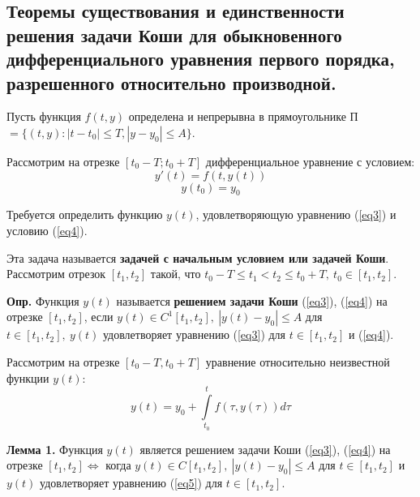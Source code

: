 \subsection{Теоремы существования и единственности решения задачи Коши для обыкновенного дифференциального уравнения первого порядка, разрешенного относительно производной.}

Пусть функция $f(t,y)$ определена и непрерывна в прямоугольнике 
П$ = \{(t, y) : |t - t_0| \leqslant T, |y - y_0| \leqslant A\}$.

Рассмотрим на отрезке $[t_0 - T ; t_0 + T ]$ дифференциальное уравнение с условием:
\begin{equation}
    y'(t) = f(t, y(t))
    \label{eq3}
\end{equation}
\begin{equation}
    y(t_0) = y_0
    \label{eq4}
\end{equation}

Требуется определить функцию $y(t)$, удовлетворяющую уравнению (\ref{eq3}) и условию (\ref{eq4}).

Эта задача называется \textbf{задачей с начальным условием или задачей Коши}. Рассмотрим отрезок $[t_1, t_2]$ такой, что $t_0 - T \leqslant t_1 < t_2 \leqslant t_0 + T,~t_0 \in [t_1, t_2]$.

\textbf{Опр.} Функция $y(t)$ называется \textbf{решением задачи Коши} (\ref{eq3}), (\ref{eq4}) на отрезке $[t_1, t_2]$, если $y(t) \in C^1[t_1, t_2],~|y(t) - y_0| \leqslant A$ для $t \in [t_1, t_2],~y(t)$ удовлетворяет уравнению (\ref{eq3}) для $t \in [t_1, t_2]$ и (\ref{eq4}).

Рассмотрим на отрезке $[t_0 - T,t_0 + T]$ уравнение относительно неизвестной функции $y(t)$:
\begin{equation}
    y(t) = y_0 + \int\limits_{t_0}^{t}f(\tau, y(\tau))d\tau
    \label{eq5}
\end{equation}

\textbf{Лемма 1.} Функция $y(t)$ является решением задачи Коши (\ref{eq3}), (\ref{eq4}) на отрезке $[t_1, t_2] \iff$ когда $y(t) \in C[t_1, t_2],~|y(t) - y_0| \leqslant A$ для $t \in [t_1, t_2]$ и $y(t)$ удовлетворяет уравнению (\ref{eq5}) для $t \in [t_1, t_2]$.

